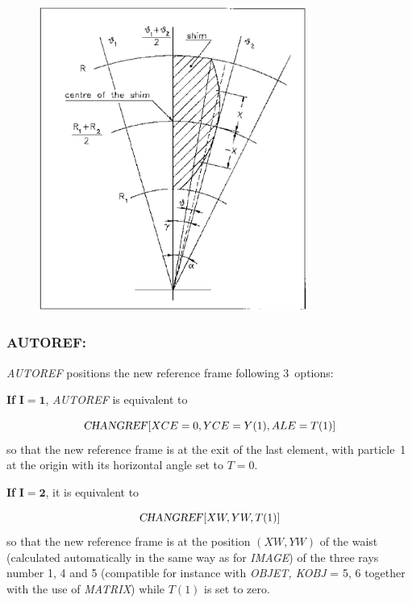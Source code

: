 \vfill 

\begin{figure}[H]
\centerline{\includegraphics[height=10cm]{Fig13.ps}}
{\setlength{\captionwidth}{14cm}
   }
\end{figure}




\newpage

\subsubsection*{AUTOREF: \AUTOREFTitl}\label{AUTOREF} 
\medskip

\textsl{AUTOREF} positions the new reference frame following 3~options:
\bigskip

\noindent\textbf{If} $\mathbf{I = 1}$, \textsl{AUTOREF} is equivalent to 

$$ \text{\textsl{CHANGREF}} \lbrack XCE=0, YCE=Y(1), ALE=T(1)\rbrack $$
%
 so that the new reference frame is at the exit of the last element,
with particle~1 at the origin with its horizontal angle set to $ T=0$.   
\bigskip

\noindent\textbf{If} $\mathbf{I=2}$, it is equivalent to

$$ \text{\textsl{CHANGREF}} \lbrack XW, YW, T(1)\rbrack $$
%
 so that the new reference frame is at the position $ (XW, YW) $ of
the waist (calculated automatically in the same way as for 
\textsl{IMAGE}) of the three rays number 1, 4 and 5 (compatible for instance
with \textsl{OBJET, KOBJ}  =  5, 6 together with the 
use of \textsl{MATRIX}) while $T(1)$ is set to zero.  
\bigskip

